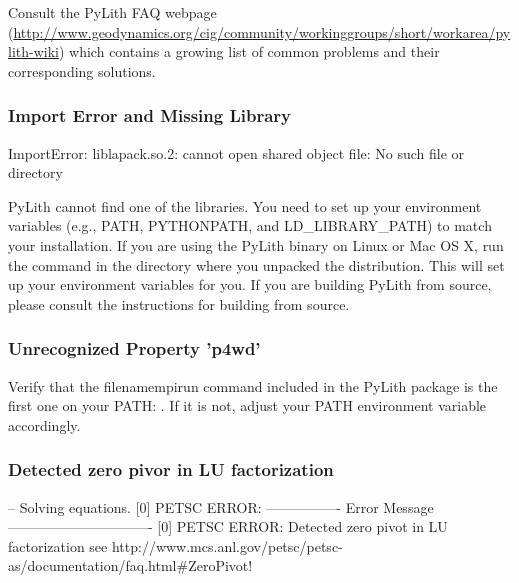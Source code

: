 Consult the PyLith FAQ webpage (\url{http://www.geodynamics.org/cig/community/workinggroups/short/workarea/pylith-wiki})
which contains a growing list of common problems and their corresponding
solutions.

\subsubsection{Import Error and Missing Library}
\begin{shell}
ImportError: liblapack.so.2: cannot open shared object file: No such file or directory
\end{shell}

PyLith cannot find one of the libraries. You need to set up your environment
variables (e.g., PATH, PYTHONPATH, and LD\_LIBRARY\_PATH) to match
your installation. If you are using the PyLith binary on Linux or
Mac OS X, run the command in the directory
where you unpacked the distribution. This will set up your environment
variables for you. If you are building PyLith from source, please
consult the instructions for building from source.

\subsubsection{Unrecognized Property 'p4wd'}

\begin{shell}
-- pyre.inventory(error) } \\
-- p4wd <- 'true' } \\
-- unrecognized property 'p4wd' } \\
>> command line:: } \\
-- pyre.inventory(error) } \\
-- p4pg <- 'true' } \\
-- unrecognized property ' p4pg'}
\end{shell}
Verify that the filename{mpirun} command included in the PyLith package is
the first one on your PATH: . If it is not, adjust your PATH environment variable accordingly.

\subsubsection{Detected zero pivor in LU factorization}

\begin{shell}
-- Solving equations.
[0] PETSC ERROR: ----------------
Error Message -------------------------------
[0] PETSC ERROR: Detected zero pivot in LU factorization
see http://www.mcs.anl.gov/petsc/petsc-as/documentation/faq.html\#ZeroPivot!
\end{shell}

